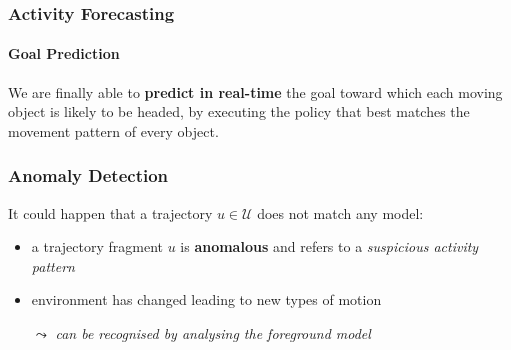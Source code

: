 \begin{frame}
	\frametitle{Activity Forecasting}
	\framesubtitle{Goal Prediction}
	
	\large
	
	\vspace{0.4cm}
	
	We are finally able to \textbf{predict in real-time} the goal toward which each moving
	object is likely to be headed, by executing the policy that best matches the movement
	pattern of every object. \\
	
	\begin{center}
	\end{center}
\end{frame}

\begin{frame}
	\frametitle{Anomaly Detection}
	
	\Large
	
	\vspace{0.3cm}
	
	It could happen that a trajectory $ u \in \mathcal{U} $ does not match any model:
	
	\begin{itemize}
		\item a trajectory fragment $ u $ is \textbf{anomalous} and refers to a
			  \emph{suspicious activity pattern}
		\item environment has changed leading to new types of motion
			  \vspace{-0.1cm}
			  \begin{tabbing}
				  \hspace{0.3cm}
				  \large
				  $ \leadsto $ \emph{can be recognised by analysing the foreground model}
			  \end{tabbing}
	\end{itemize}
\end{frame}
